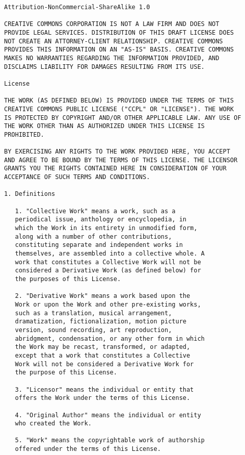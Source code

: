 \begin{Verbatim}[fontsize=\scriptsize]
Attribution-NonCommercial-ShareAlike 1.0

CREATIVE COMMONS CORPORATION IS NOT A LAW FIRM AND DOES NOT
PROVIDE LEGAL SERVICES. DISTRIBUTION OF THIS DRAFT LICENSE DOES
NOT CREATE AN ATTORNEY-CLIENT RELATIONSHIP. CREATIVE COMMONS
PROVIDES THIS INFORMATION ON AN "AS-IS" BASIS. CREATIVE COMMONS
MAKES NO WARRANTIES REGARDING THE INFORMATION PROVIDED, AND
DISCLAIMS LIABILITY FOR DAMAGES RESULTING FROM ITS USE.

License

THE WORK (AS DEFINED BELOW) IS PROVIDED UNDER THE TERMS OF THIS
CREATIVE COMMONS PUBLIC LICENSE ("CCPL" OR "LICENSE"). THE WORK
IS PROTECTED BY COPYRIGHT AND/OR OTHER APPLICABLE LAW. ANY USE OF
THE WORK OTHER THAN AS AUTHORIZED UNDER THIS LICENSE IS
PROHIBITED.

BY EXERCISING ANY RIGHTS TO THE WORK PROVIDED HERE, YOU ACCEPT
AND AGREE TO BE BOUND BY THE TERMS OF THIS LICENSE. THE LICENSOR
GRANTS YOU THE RIGHTS CONTAINED HERE IN CONSIDERATION OF YOUR
ACCEPTANCE OF SUCH TERMS AND CONDITIONS.

1. Definitions

   1. "Collective Work" means a work, such as a
   periodical issue, anthology or encyclopedia, in
   which the Work in its entirety in unmodified form,
   along with a number of other contributions,
   constituting separate and independent works in
   themselves, are assembled into a collective whole. A
   work that constitutes a Collective Work will not be
   considered a Derivative Work (as defined below) for
   the purposes of this License.

   2. "Derivative Work" means a work based upon the
   Work or upon the Work and other pre-existing works,
   such as a translation, musical arrangement,
   dramatization, fictionalization, motion picture
   version, sound recording, art reproduction,
   abridgment, condensation, or any other form in which
   the Work may be recast, transformed, or adapted,
   except that a work that constitutes a Collective
   Work will not be considered a Derivative Work for
   the purpose of this License.

   3. "Licensor" means the individual or entity that
   offers the Work under the terms of this License.

   4. "Original Author" means the individual or entity
   who created the Work.

   5. "Work" means the copyrightable work of authorship
   offered under the terms of this License.


\end{Verbatim}
